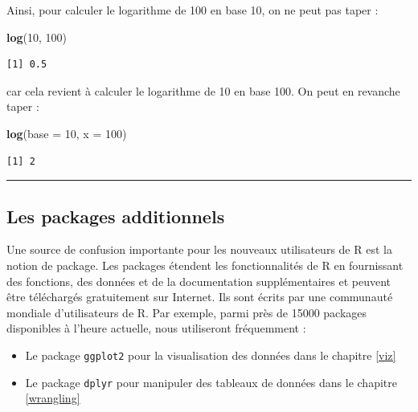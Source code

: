 \documentclass[
  a4paper,
]{article}
\newenvironment{Shaded}{\begin{snugshade}}{\end{snugshade}}
\newcommand{\DataTypeTok}[1]{\textcolor[rgb]{0.00,0.34,0.68}{#1}}
\newcommand{\DecValTok}[1]{\textcolor[rgb]{0.69,0.50,0.00}{#1}}
\newcommand{\KeywordTok}[1]{\textcolor[rgb]{0.12,0.11,0.11}{\textbf{#1}}}
\newcommand{\NormalTok}[1]{\textcolor[rgb]{0.12,0.11,0.11}{#1}}
\providecommand{\tightlist}{%
  \setlength{\itemsep}{0pt}\setlength{\parskip}{0pt}}
\begin{document}
Ainsi, pour calculer le logarithme de 100 en base 10, on ne peut pas taper :

\begin{Shaded}
\begin{Highlighting}[]
\KeywordTok{log}\NormalTok{(}\DecValTok{10}\NormalTok{, }\DecValTok{100}\NormalTok{)}
\end{Highlighting}
\end{Shaded}

\begin{verbatim}
[1] 0.5
\end{verbatim}

car cela revient à calculer le logarithme de 10 en base 100. On peut en revanche taper :

\begin{Shaded}
\begin{Highlighting}[]
\KeywordTok{log}\NormalTok{(}\DataTypeTok{base =} \DecValTok{10}\NormalTok{, }\DataTypeTok{x =} \DecValTok{100}\NormalTok{)}
\end{Highlighting}
\end{Shaded}

\begin{verbatim}
[1] 2
\end{verbatim}

\begin{center}\rule{0.5\linewidth}{0.5pt}\end{center}

\hypertarget{packages}{%
\subsection{Les packages additionnels}\label{packages}}

Une source de confusion importante pour les nouveaux utilisateurs de R est la notion de package. Les packages étendent les fonctionnalités de R en fournissant des fonctions, des données et de la documentation supplémentaires et peuvent être téléchargés gratuitement sur Internet. Ils sont écrits par une communauté mondiale d'utilisateurs de R. Par exemple, parmi près de 15000 packages disponibles à l'heure actuelle, nous utiliseront fréquemment :

\begin{itemize}
\tightlist
\item
  Le package \texttt{ggplot2} pour la visualisation des données dans le chapitre \ref{viz}
\item
  Le package \texttt{dplyr} pour manipuler des tableaux de données dans le chapitre \ref{wrangling}
\end{itemize}
\end{document}
